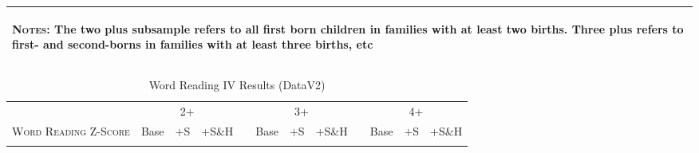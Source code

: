 \begin{landscape}
\begin{table}[htpb!]
\begin{center}
\begin{tabular}{lcccp{2mm}cccp{2mm}ccc}
\midrule\multicolumn{12}{p{19.2cm}}{\begin{footnotesize}\textsc{Notes:} The two plus subsample refers to all first born children in families with at least two births.  Three plus refers to first- and second-borns in families with at least three births, etc\end{footnotesize}} \\ \bottomrule 
\end{tabular}\end{center}\end{table}\end{landscape}\begin{landscape}\begin{table}[htpb!]\caption{Word Reading IV Results (DataV2)}
\label{TWINtab:IVAll}
\begin{center}\begin{tabular}{lcccp{2mm}cccp{2mm}ccc}
\toprule \toprule 
&\multicolumn{3}{c}{2+}&&\multicolumn{3}{c}{3+}&&\multicolumn{3}{c}{4+}\\ \cmidrule(r){2-4} \cmidrule(r){6-8} \cmidrule(r){10-12} 
\textsc{Word Reading Z-Score}&Base&+S&+S\&H&&Base&+S&+S\&H&&Base&+S&+S\&H\\ \midrule 
\begin{footnotesize}\end{footnotesize}& 
\begin{footnotesize}\end{footnotesize}& 
\begin{footnotesize}\end{footnotesize}& 
\begin{footnotesize}\end{footnotesize}& 
\begin{footnotesize}\end{footnotesize}& 
\begin{footnotesize}\end{footnotesize}& 
\begin{footnotesize}\end{footnotesize}& 
\begin{footnotesize}\end{footnotesize}& 
\begin{footnotesize}\end{footnotesize}& 
\begin{footnotesize}\end{footnotesize}& 
\begin{footnotesize}\end{footnotesize}& 
\begin{footnotesize}\end{footnotesize}\\ 

\end{tabular}
\end{center}
\end{table}
\end{landscape}
